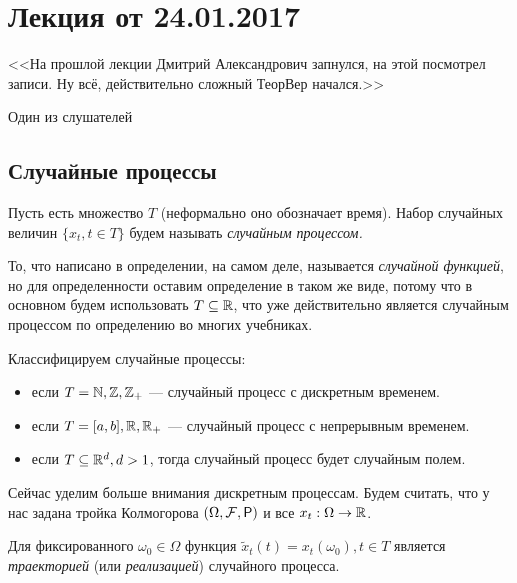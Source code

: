 \section{Лекция от 24.01.2017}

\epigraph{<<На прошлой лекции Дмитрий Александрович запнулся, на этой посмотрел записи. Ну всё, действительно сложный ТеорВер начался.>>}
{Один из слушателей}

\subsection{Случайные процессы}

\begin{definition}
  Пусть есть множество $T$ (неформально оно обозначает время). Набор случайных
  величин $\{x_t, t \in T\}$ будем называть \emph{случайным процессом.}
\end{definition}

\begin{remark}
  То, что написано в определении, на самом деле, называется \emph{случайной функцией},
  но для определенности оставим определение в таком же виде, потому что в основном
  будем использовать $T \subseteq \mathbb{R}$, что уже действительно является случайным
  процессом по определению во многих учебниках.
\end{remark}

\begin{definition}
  Классифицируем случайные процессы:
  \begin{itemize}
    \item если $T = \mathbb{N}, \mathbb{Z}, \mathbb{Z}_{+}$ --- случайный процесс с дискретным временем.
    \item если $T = [a, b], \mathbb{R}, \mathbb{R}_{+}$ --- случайный процесс с непрерывным
    временем.
    \item если $T \subseteq \mathbb{R}^d, d > 1$, тогда случайный процесс будет случайным
    полем.
  \end{itemize}
\end{definition}

Сейчас уделим больше внимания дискретным процессам. Будем считать, что у нас
задана тройка Колмогорова $(\Omega, \F, \Pr)$ и все $x_t: \Omega \to \mathbb{R}$.

\begin{definition}
  Для фиксированного $\omega_0 \in \Omega$ функция $\tilde{x}_t(t) = x_t(\omega_0), t \in T$
  является \emph{траекторией} (или \emph{реализацией}) случайного процесса.
\end{definition}

